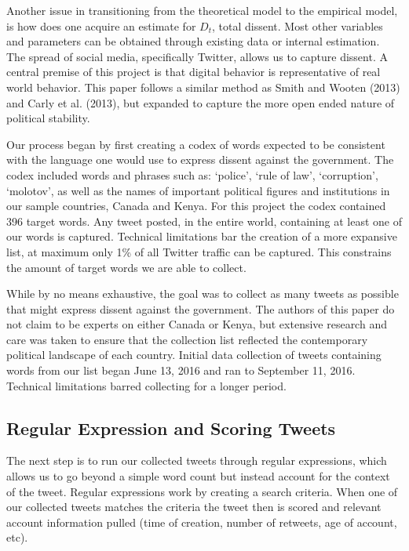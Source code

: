 \documentclass[12pt]{article}
\begin{document}
\begin{spacing}{1.5}
Another issue in transitioning from the theoretical model to the empirical model, is how does one acquire an estimate for $D_t$, total dissent. Most other variables and parameters can be obtained through existing data or internal estimation. The spread of social media, specifically Twitter, allows us to capture dissent. A central premise of this project is that digital behavior is representative of real world behavior. This paper follows a similar method as Smith and Wooten (2013) and Carly et al. (2013), but expanded to capture the more open ended nature of political stability. 

Our process began by first creating a codex of words expected to be consistent with the language one would use to express dissent against the government. The codex included words and phrases such as: `police', `rule of law', `corruption', `molotov', as well as the names of important political figures and institutions in our sample countries, Canada and Kenya. For this project the codex contained 396 target words. Any tweet posted, in the entire world, containing at least one of our words is captured. Technical limitations bar the creation of a more expansive list, at maximum only 1\% of all Twitter traffic can be captured. This constrains the amount of target words we are able to collect. 

While by no means exhaustive, the goal was to collect as many tweets as possible that might express dissent against the government. The authors of this paper do not claim to be experts on either Canada or Kenya, but extensive research and care was taken to ensure that the collection list reflected the contemporary political landscape of each country. Initial data collection of tweets containing words from our list began June 13, 2016 and ran to September 11, 2016. Technical limitations barred collecting for a longer period. 


\subsection*{Regular Expression and Scoring Tweets}

The next step is to run our collected tweets through regular expressions, which allows us to go beyond a simple word count but instead account for the context of the tweet. Regular expressions work by creating a search criteria. When one of our collected tweets matches the criteria the tweet then is scored and relevant account information pulled (time of creation, number of retweets, age of account, etc). 



\end{spacing}
\end{document}
